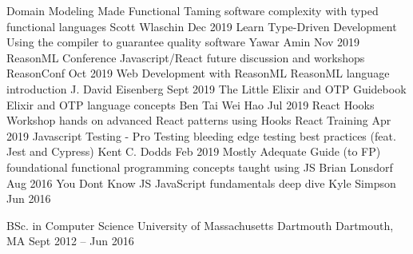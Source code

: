 \documentclass[]{awesome-cv}
\begin{document}
\begin{cvhonors}
	\cvhonor
	{Domain Modeling Made Functional}
	{Taming software complexity with typed functional languages}
	{Scott Wlaschin}
	{Dec 2019}
	\cvhonor
	{Learn Type-Driven Development}
	{Using the compiler to guarantee quality software}
	{Yawar Amin}
	{Nov 2019}
	\cvhonor
	{ReasonML Conference}
	{Javascript/React future discussion and workshops}
	{ReasonConf}
	{Oct 2019}
	\cvhonor
	{Web Development with ReasonML}
	{ReasonML language introduction}
	{J. David Eisenberg}
	{Sept 2019}
	\cvhonor
	{The Little Elixir and OTP Guidebook}
	{Elixir and OTP language concepts}
	{Ben Tai Wei Hao}
	{Jul 2019}
	\cvhonor
	{React Hooks Workshop}
	{hands on advanced React patterns using Hooks}
	{React Training}
	{Apr 2019}
	\cvhonor
	{Javascript Testing - Pro Testing}
	{bleeding edge testing best practices (feat. Jest and Cypress)}
	{Kent C. Dodds}
	{Feb 2019}
	\cvhonor
	{Mostly Adequate Guide (to FP)}
	{foundational functional programming concepts taught using JS}
	{Brian Lonsdorf}
	{Aug 2016}
	\cvhonor
	{You Don\textquotesingle{}t Know JS}
	{JavaScript fundamentals deep dive}
	{Kyle Simpson}
	{Jun 2016}
\end{cvhonors}

\begin{cventries}
	\cventry
	{BSc. in Computer Science}
	{University of Massachusetts Dartmouth}
	{Dartmouth, MA}
	{Sept 2012 – Jun 2016}
	{}
\end{cventries}
\end{document}
